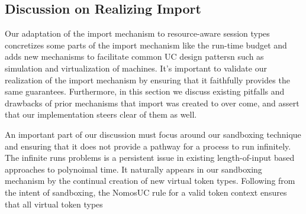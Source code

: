 %

\subsection{Discussion on Realizing Import}
Our adaptation of the import mechanism to resource-aware session types concretizes some parts of the import mechanism like the run-time budget and adds new mechanisms
to facilitate common UC design pattersn such as simulation and virtualization of machines. 
It's important to validate our realization of the import mechanism by ensuring that it faithfully provides the same guarantees.
Furthermore, in this section we discuss existing pitfalls and drawbacks of prior mechanisms that import was created to over come, and assert that our implementation steers clear of them as well.

An important part of our discussion must focus around our sandboxing technique and ensuring that it does not provide a pathway for a process to run infinitely.
The infinite runs problems is a persistent issue in existing length-of-input based approaches to polynoimal time.
It naturally appears in our sandboxing mechanism by the continual creation of new virtual token types. Following from the intent of sandboxing, the NomosUC rule for a valid token context ensures that all virtual token types  

